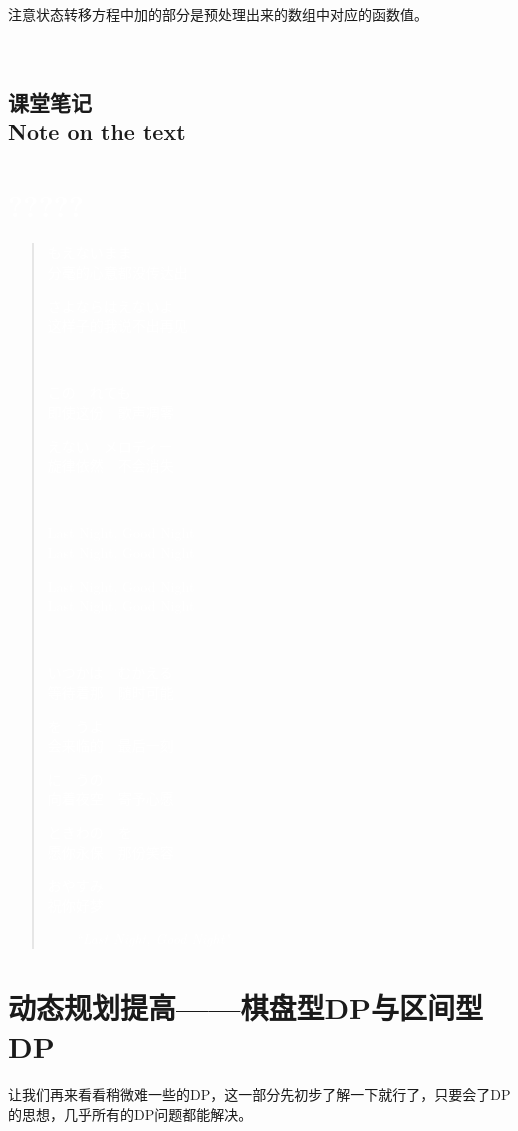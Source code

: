 \documentclass{article}
\theoremstyle{nonumberplain}
\newcommand{\note}{\ \par
	\subsection*{课堂笔记\\\tiny{Note on the text}}
	\newpage}
\begin{document}
注意状态转移方程中加的部分是预处理出来的数组中对应的函数值。

\note
\section*{\textcolor{white}{?????}}
\begin{quote}
	\textcolor{white}{もえないまま\\
		分毫的心意都没传达出}

	\textcolor{white}{さよならはえないよ\\
		这样子的我说不出再见}

	\ \par

	\textcolor{white}{この　れても\\
		即使这份　歌声凋零}

	\textcolor{white}{えない　メロディー\\
		旋律依然　不会消失}

	\ \par

	\textcolor{white}{Last Night, Good Night\\
		Last Night, Good Night}

	\textcolor{white}{Last Night, Good Night\\
		Last Night, Good Night}

	\ \par

	\textcolor{white}{いつかは　むかえる\\
		等待着那　随时可能}

	\textcolor{white}{を　うよ\\
		会来临的　最后一刻}

	\textcolor{white}{に　うの\\
		向着夜空　寄予心愿}

	\textcolor{white}{ときわの　を\\
		愿你永保　那份笑容}

	\textcolor{white}{おやすみ\\
		祝你好梦}
	\begin{flushright}\textcolor{white}{------}\em{\textcolor{white}{``Last Night, Good Night"}}\end{flushright}
\end{quote}

\newpage
\section{动态规划提高------棋盘型DP与区间型DP}
让我们再来看看稍微难一些的DP，这一部分先初步了解一下就行了，只要会了DP的思想，几乎所有的DP问题都能解决。
\end{document}
